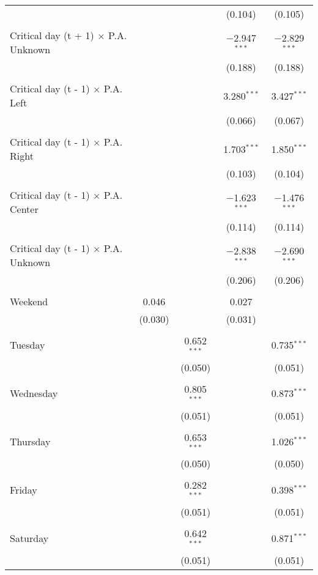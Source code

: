 \documentclass[
]{article}
\begin{document}
\begin{table}[!htbp]
{\begin{tabular}{@{\extracolsep{5pt}}lcccc}
  &  &  & (0.104) & (0.105) \\ 
  & & & & \\ 
 Critical day (t + 1) $\times$ P.A. Unknown &  &  & $-$2.947$^{***}$ & $-$2.829$^{***}$ \\ 
  &  &  & (0.188) & (0.188) \\ 
  & & & & \\ 
 Critical day (t - 1) $\times$ P.A. Left &  &  & 3.280$^{***}$ & 3.427$^{***}$ \\ 
  &  &  & (0.066) & (0.067) \\ 
  & & & & \\ 
 Critical day (t - 1) $\times$ P.A. Right &  &  & 1.703$^{***}$ & 1.850$^{***}$ \\ 
  &  &  & (0.103) & (0.104) \\ 
  & & & & \\ 
 Critical day (t - 1) $\times$ P.A. Center &  &  & $-$1.623$^{***}$ & $-$1.476$^{***}$ \\ 
  &  &  & (0.114) & (0.114) \\ 
  & & & & \\ 
 Critical day (t - 1) $\times$ P.A. Unknown &  &  & $-$2.838$^{***}$ & $-$2.690$^{***}$ \\ 
  &  &  & (0.206) & (0.206) \\ 
  & & & & \\ 
 Weekend & 0.046 &  & 0.027 &  \\ 
  & (0.030) &  & (0.031) &  \\ 
  & & & & \\ 
 Tuesday &  & 0.652$^{***}$ &  & 0.735$^{***}$ \\ 
  &  & (0.050) &  & (0.051) \\ 
  & & & & \\ 
 Wednesday &  & 0.805$^{***}$ &  & 0.873$^{***}$ \\ 
  &  & (0.051) &  & (0.051) \\ 
  & & & & \\ 
 Thursday &  & 0.653$^{***}$ &  & 1.026$^{***}$ \\ 
  &  & (0.050) &  & (0.050) \\ 
  & & & & \\ 
 Friday &  & 0.282$^{***}$ &  & 0.398$^{***}$ \\ 
  &  & (0.051) &  & (0.051) \\ 
  & & & & \\ 
 Saturday &  & 0.642$^{***}$ &  & 0.871$^{***}$ \\ 
  &  & (0.051) &  & (0.051) \\ 

\end{tabular}}
\end{table}
\end{document}
